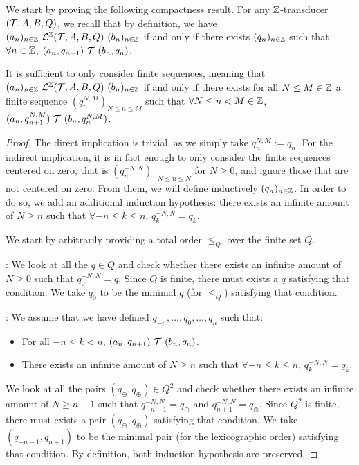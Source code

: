 We start by proving the following compactness result.
For any ${\mathbb{Z}}$-transducer $({\mathcal{T}},A,B,Q)$, we recall that by definition, we have $(a_n)_{n \in {\mathbb{Z}}}~{\mathcal{L}}^{\mathbb{Z}}({\mathcal{T}},A,B,Q)~(b_n)_{n \in {\mathbb{Z}}}$ if and only if there exists $(q_n)_{n \in {\mathbb{Z}}}$ such that $\forall n \in {\mathbb{Z}}$, $(a_n,q_{n+1})~{\mathcal{T}}~(b_n,q_n)$.
\begin{theorem}[Compactness]\label{appthm:compactness} 
	It is sufficient to only consider finite sequences, meaning that $(a_n)_{n \in {\mathbb{Z}}}~{\mathcal{L}}^{\mathbb{Z}}({\mathcal{T}},A,B,Q)~(b_n)_{n \in {\mathbb{Z}}}$  if and only if there exists for all $N \leq M \in {\mathbb{Z}}$ a finite sequence $(q_{n}^{N,M})_{N \leq n \leq M}$ such that $\forall N \leq n < M \in {\mathbb{Z}}$, $(a_n,q^{N,M}_{n+1})~{\mathcal{T}}~(b_n,q^{N,M}_n)$.
\end{theorem}
\begin{proof}
	The direct implication is trivial, as we simply take $q_{n}^{N,M} := q_n$. For the indirect implication, it is in fact enough to only consider the finite sequences centered on zero, that is $(q_{n}^{-N,N})_{-N \leq n \leq N}$ for $N \geq 0$, and ignore those that are not centered on zero. From them, we will define inductively $(q_n)_{n \in {\mathbb{Z}}}$. In order to do so, we add an additional induction hypothesis: there exists an infinite amount of $N \geq n$ such that $\forall -n \leq k \leq n$, $q^{-N,N}_{k} = q_k$.
	
	We start by arbitrarily providing a total order $\leq_Q$ over the finite set $Q$. 
	
	: We look at all the $q \in Q$ and check whether there exists an infinite amount of $N \geq 0$ such that $q^{-N,N}_0 = q$. Since $Q$ is finite, there must exists a $q$ satisfying that condition. We take $q_0$ to be the minimal $q$ (for $\leq_Q$) satisfying that condition.
	
	: We assume that we have defined $q_{-n},\dots,q_0,\dots,q_n$ such that:
	\begin{itemize}
		\item For all $-n \leq k < n$, $(a_n,q_{n+1})~{\mathcal{T}}~(b_n,q_n)$.
		\item There exists an infinite amount of $N \geq n$ such that $\forall -n \leq k \leq n$, $q^{-N,N}_{k} = q_k$.
	\end{itemize} 
	We look at all the pairs $(q_{\ominus},q_{\oplus}) \in Q^2$ and check whether there exists an infinite amount of $N \geq n+1$ such that $q^{-N,N}_{-n-1} = q_{\ominus}$ and $q^{-N,N}_{n+1} = q_{\oplus}$. Since $Q^2$ is finite, there must exists a pair $(q_{\ominus},q_{\oplus})$ satisfying that condition. We take $(q_{-n-1},q_{n+1})$ to be the minimal pair (for the lexicographic order) satisfying that condition. By definition, both induction hypothesis are preserved.
\end{proof}

